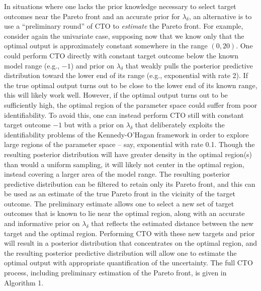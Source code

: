 \documentclass[12pt]{article}
\begin{document}
%
In situations where one lacks the prior knowledge necessary to select target outcomes near the Pareto front and an accurate prior for $\lambda_\delta$, an alternative is to use a ``preliminary round'' of CTO to {\em estimate} the Pareto front.
%
For example, consider again the univariate case, supposing now that we know only that the optimal output is approximately constant somewhere in the range $(0,20)$. 
%
One could perform CTO directly with constant target outcome below the known model range (e.g., $-1$) and prior on $\lambda_\delta$ that weakly pulls the posterior predictive distribution toward the lower end of its range (e.g., exponential with rate 2).
%
If the true optimal output turns out to be close to the lower end of its known range, this will likely work well.
%
However, if the optimal output turns out to be sufficiently high, the optimal region of the parameter space could suffer from poor identifiability.
%
To avoid this, one can instead perform CTO still with constant target outcome $-1$ but with a prior on $\lambda_\delta$ that deliberately exploits the identifiability problems of the Kennedy-O'Hagan framework in order to explore large regions of the parameter space -- say, exponential with rate 0.1.
% 
Though the resulting posterior distribution will have greater density in the optimal region(s) than would a uniform sampling, it will likely not center in the optimal region, instead covering a larger area of the model range.
%
The resulting posterior predictive distribution can be filtered to retain only its Pareto front, and this can be used as an estimate of the true Pareto front in the vicinity of the target outcome.
%
%
The preliminary estimate allows one to select a new set of target outcomes that is known to lie near the optimal region, along with an accurate and informative prior on $\lambda_\delta$ that reflects the estimated distance between the new target and the optimal region.
%
Performing CTO with these new targets and prior will result in a posterior distribution that concentrates on the optimal region, and the resulting posterior predictive distribution will allow one to estimate the optimal output with appropriate quantification of the uncertainty.
%
%
%
The full CTO process, including preliminary estimation of the Pareto front, is given in Algorithm 1.
\end{document}
